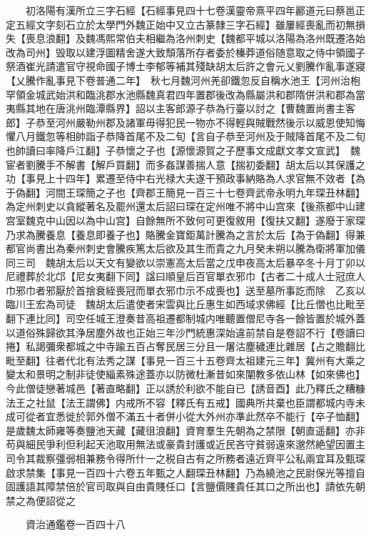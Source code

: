 　　初洛陽有漢所立三字石經【石經事見四十七卷漢靈帝熹平四年酈道元曰蔡邕正定五經文字刻石立於太學門外魏正始中又立古篆隸三字石經】雖屢經喪亂而初無損失【喪息浪翻】及魏馮熙常伯夫相繼為洛州刺史【魏都平城以洛陽為洛州既遷洛始改為司州】毁取以建浮圖精舍遂大致頹落所存者委於榛莽道俗随意取之侍中領國子祭酒崔光請遣官守視命國子博士李郁等補其殘缺胡太后許之會元乂劉騰作亂事遂寢【乂騰作亂事見下卷普通二年】　秋七月魏河州羌卻鐵忽反自稱水池王【河州治枹罕領金城武始洪和臨洮郡水池縣魏真君四年置郡後改為縣屬洪和郡隋併洪和郡為當夷縣其地在唐洮州臨潭縣界】詔以主客郎源子恭為行臺以討之【曹魏置尚書主客郎】子恭至河州嚴勒州郡及諸軍毋得犯民一物亦不得輕與賊戰然後示以威恩使知悔懼八月鐵忽等相帥詣子恭降首尾不及二旬【言自子恭至河州及于賊降首尾不及二旬也帥讀曰率降戶江翻】子恭懷之子也【源懷源賀之子歷事文成獻文孝文宣武】　魏宦者劉騰手不解書【解戶買翻】而多姦謀善揣人意【揣初委翻】胡太后以其保護之功【事見上十四年】累遷至侍中右光禄大夫遂干預政事納賂為人求官無不效者【為于偽翻】河間王琛簡之子也【齊郡王簡見一百三十七卷齊武帝永明九年琛丑林翻】為定州刺史以貪縱著名及罷州還太后詔曰琛在定州唯不將中山宫來【後燕都中山建宫室魏克中山因以為中山宫】自餘無所不致何可更復敘用【復扶又翻】遂廢于家琛乃求為騰養息【養息即養子也】賂騰金寶鉅萬計騰為之言於太后【為于偽翻】得兼都官尚書出為秦州刺史會騰疾篤太后欲及其生而貴之九月癸未朔以騰為衛將軍加儀同三司　魏胡太后以天文有變欲以崇憲高太后當之戊申夜高太后暴卒冬十月丁卯以尼禮葬於北邙【尼女夷翻下同】諡曰順皇后百官單衣邪巾【古者二十成人士冠庶人巾邪巾者邪厭於首捨衰絰喪冠而單衣邪巾示不成喪也】送至墓所事訖而除　乙亥以臨川王宏為司徒　魏胡太后遣使者宋雲與比丘惠生如西域求佛經【比丘僧也比毗至翻下連比同】司空任城王澄奏昔高祖遷都制城内唯聽置僧尼寺各一餘皆置於城外蓋以道俗殊歸欲其浄居塵外故也正始三年沙門統惠深始違前禁自是卷詔不行【卷讀曰捲】私謁彌衆都城之中寺踰五百占奪民居三分且一屠沽塵穢連比雜居【占之贍翻比毗至翻】往者代北有法秀之謀【事見一百三十五卷齊太祖建元三年】冀州有大乘之變太和景明之制非徒使緇素殊途蓋亦以防微杜漸昔如來闡教多依山林【如來佛也】今此僧徒戀著城邑【著直略翻】正以誘於利欲不能自已【誘音酉】此乃釋氏之糟糠法王之社鼠【法王謂佛】内戒所不容【釋氏有五戒】國典所共棄也臣謂都城内寺未成可從者宜悉徙於郭外僧不滿五十者併小從大外州亦準此然卒不能行【卒子恤翻】　是歲魏太師雍等奏鹽池天藏【藏徂浪翻】資育羣生先朝為之禁限【朝直遥翻】亦非苟與細民爭利但利起天池取用無法或豪貴封護或近民吝守貧弱遠來邈然絶望因置主司令其裁察彊弱相兼務令得所什一之税自古有之所務者遠近齊平公私兩宜耳及甄琛啟求禁集【事見一百四十六卷五年甄之人翻琛丑林翻】乃為繞池之民尉保光等擅自固護語其障禁倍於官司取與自由貴賤任口【言鹽價賤貴任其口之所出也】請依先朝禁之為便詔從之

　　資治通鑑卷一百四十八  
    



